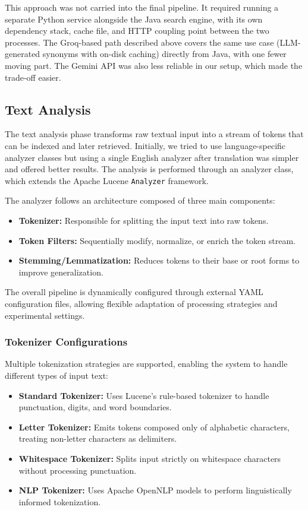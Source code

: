 This approach was not carried into the final pipeline. It required running a separate Python service alongside the Java search engine, with its own dependency stack, cache file, and HTTP coupling point between the two processes. The Groq-based path described above covers the same use case (LLM-generated synonyms with on-disk caching) directly from Java, with one fewer moving part. The Gemini API was also less reliable in our setup, which made the trade-off easier.

\subsection{Text Analysis}

The text analysis phase transforms raw textual input into a stream of tokens that can be indexed and later retrieved.
Initially, we tried to use language-specific analyzer classes but using a single English analyzer after translation was simpler and offered better results.
The analysis is performed through an analyzer class, which extends the Apache Lucene \texttt{Analyzer} framework.

The analyzer follows an architecture composed of three main components:

\begin{itemize}
    \item \textbf{Tokenizer:} Responsible for splitting the input text into raw tokens.
    \item \textbf{Token Filters:} Sequentially modify, normalize, or enrich the token stream.
    \item \textbf{Stemming/Lemmatization:} Reduces tokens to their base or root forms to improve generalization.
\end{itemize}

The overall pipeline is dynamically configured through external YAML configuration files, allowing flexible adaptation of processing strategies and experimental settings.

\subsubsection{Tokenizer Configurations}

Multiple tokenization strategies are supported, enabling the system to handle different types of input text:

\begin{itemize}
    \item \textbf{Standard Tokenizer:} Uses Lucene’s rule-based tokenizer to handle punctuation, digits, and word boundaries.
    \item \textbf{Letter Tokenizer:} Emits tokens composed only of alphabetic characters, treating non-letter characters as delimiters.
    \item \textbf{Whitespace Tokenizer:} Splits input strictly on whitespace characters without processing punctuation.
    \item \textbf{NLP Tokenizer:} Uses Apache OpenNLP models to perform linguistically informed tokenization.
\end{itemize}

